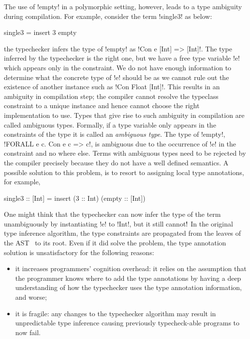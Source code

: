 \documentclass[screen,nonacm,manuscript,review]{acmart} %
\begin{document}
The use of !empty! in a polymorphic setting, however, leads to a type ambiguity during
compilation. For example, consider the term !single3! as below:

\begin{CenteredBox}
\begin{code}
single3 = insert 3 empty
\end{code}
\end{CenteredBox}

the typechecker infers the type of !empty! as !Con e [Int] => [Int]!. The type inferred by
the typechecker is the right one, but we have a free type variable
!e! which appears only in the constraint. We do not have enough
information to determine what the concrete type of !e! should be as
we cannot rule out the existence of another instance such as !Con Float [Int]!.
This results in an ambiguity in compilation step; the compiler cannot
resolve the typeclass constraint to a unique instance and hence cannot
choose the right implementation to use. Types that
give rise to such ambiguity in compilation are called ambiguous types. Formally, if a
type variable only appears in the constraints of the type it is called
an \emph{ambiguous type}. The type of !empty!,
!FORALL e c. Con e c => c!, is ambiguous due to the occurrence of !e! in the
constraint and no where else. Terms with ambiguous types need to be rejected by the compiler
precisely because they do not have a well defined semantics.
A possible solution to this problem, is to resort to assigning local
type annotations, for example,

\begin{CenteredBox}
\begin{code}
single3 :: [Int] = insert (3 :: Int) (empty :: [Int])
\end{code}
\end{CenteredBox}

One might think that the typechecker can now infer the type of the term unambiguously by
instantiating !e! to !Int!, but it still cannot$!$ In the
original type inference algorithm, the type constraints are propagated from
the leaves of the AST~\cite{lee_proofs_1998} to its root. Even if it
did solve the problem, the type annotation solution is unsatisfactory for the following reasons:
\begin{itemize}
\item it increases programmers' cognition overhead:
  it relies on the assumption that the programmer knows where to add the
  type annotations by having a deep understanding of how the typechecker
  uses the type annotation information, and worse;
\item it is fragile:
  any changes to the typechecker algorithm may result in unpredictable
  type inference causing previously typecheck-able programs to now fail.
\end{itemize}
\end{document}
